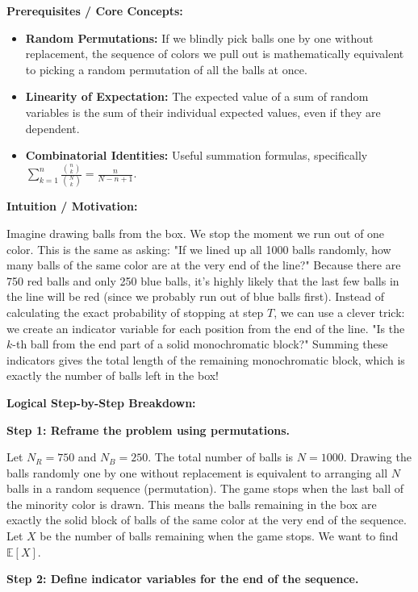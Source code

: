 \begin{solution}
\textbf{Prerequisites / Core Concepts:}
\begin{itemize}
    \item \textbf{Random Permutations:} If we blindly pick balls one by one without replacement, the sequence of colors we pull out is mathematically equivalent to picking a random permutation of all the balls at once.
    \item \textbf{Linearity of Expectation:} The expected value of a sum of random variables is the sum of their individual expected values, even if they are dependent.
    \item \textbf{Combinatorial Identities:} Useful summation formulas, specifically $\sum_{k=1}^n \frac{\binom{n}{k}}{\binom{N}{k}} = \frac{n}{N-n+1}$.
\end{itemize}

\textbf{Intuition / Motivation:}

Imagine drawing balls from the box. We stop the moment we run out of one color. This is the same as asking: "If we lined up all 1000 balls randomly, how many balls of the same color are at the very end of the line?" 
Because there are 750 red balls and only 250 blue balls, it's highly likely that the last few balls in the line will be red (since we probably run out of blue balls first). 
Instead of calculating the exact probability of stopping at step $T$, we can use a clever trick: we create an indicator variable for each position from the end of the line. "Is the $k$-th ball from the end part of a solid monochromatic block?" Summing these indicators gives the total length of the remaining monochromatic block, which is exactly the number of balls left in the box!

\textbf{Logical Step-by-Step Breakdown:}

\textbf{Step 1: Reframe the problem using permutations.}

Let $N_R = 750$ and $N_B = 250$. The total number of balls is $N = 1000$.
Drawing the balls randomly one by one without replacement is equivalent to arranging all $N$ balls in a random sequence (permutation).
The game stops when the last ball of the minority color is drawn. This means the balls remaining in the box are exactly the solid block of balls of the same color at the very end of the sequence.
Let $X$ be the number of balls remaining when the game stops. We want to find $\mathbb{E}[X]$.

\textbf{Step 2: Define indicator variables for the end of the sequence.}


\end{solution}
